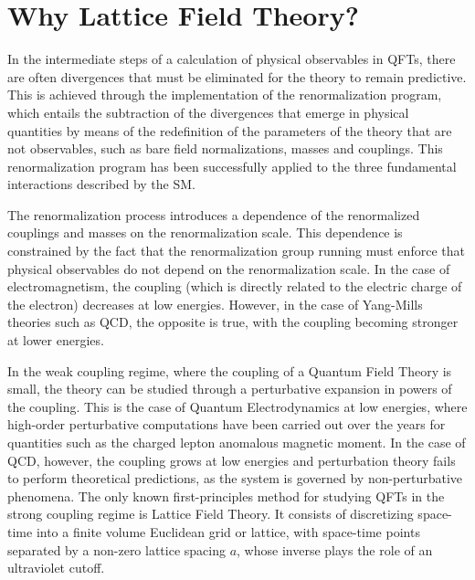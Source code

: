 \section*{Why Lattice Field Theory?}

In the intermediate steps of a calculation of physical observables in QFTs, there are often divergences that must be eliminated for the theory to remain predictive. This is achieved through the implementation of the renormalization program, which entails the subtraction of the divergences that emerge in physical quantities by means of the redefinition of the parameters of the theory that are not observables, such as bare field normalizations, masses and couplings. This renormalization program has been successfully applied to the three fundamental interactions described by the SM.

The renormalization process introduces a dependence of the renormalized couplings and masses  on the renormalization scale. This dependence is  constrained by the fact that the renormalization group running  must enforce that physical observables do not depend on the renormalization scale.  In the case of electromagnetism, the coupling (which is directly related to the electric charge of the electron) decreases at low energies. However, in the case of Yang-Mills theories such as QCD, the opposite is true, with the coupling becoming stronger at lower energies. 

In the weak coupling regime, where the coupling of a Quantum Field Theory is small, the theory can be studied through a perturbative expansion in powers of the coupling. This is the case of Quantum Electrodynamics at low energies, where high-order perturbative computations have been carried out over the years for quantities such as the charged lepton anomalous magnetic moment. In the case of QCD, however, the coupling grows at low energies and perturbation theory fails to perform theoretical predictions, as the system is governed by non-perturbative phenomena. The only known first-principles method for studying QFTs in the strong coupling regime is Lattice Field Theory. It consists of discretizing space-time into a finite volume Euclidean grid or lattice, with space-time points separated by a non-zero lattice spacing $a$, whose inverse plays the role of an ultraviolet cutoff. 


